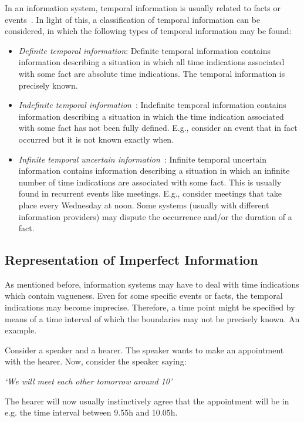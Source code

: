 In an information system, temporal information is usually related to facts or events~\cite{Chountas2000}. In light of this, a classification of temporal information can be considered, in which the following types of temporal information may be found:


\begin{itemize}
\item \emph{Definite temporal information}:
Definite temporal information contains information describing a situation in which all time indications associated with some fact are absolute time indications. The temporal information is precisely known.

\item \emph{Indefinite temporal information}~\cite{Dey1996}:
Indefinite temporal information contains information describing a situation in which the time indication associated with some fact has not been fully defined. E.g., consider an event that in fact occurred but it is not known exactly when.

\item \emph{Infinite temporal uncertain information}~\cite{Kabanza1990}:
Infinite temporal uncertain information contains information describing a situation in which an infinite number of time indications are associated with some fact. This is usually found in recurrent events like meetings. E.g., consider meetings that take place every Wednesday at noon. Some systems (usually with different information providers) may dispute the occurrence and/or the duration of a fact.
\end{itemize}

\subsection{\label{subsec:representation}Representation of Imperfect Information}
As mentioned before, information systems may have to deal with time indications which contain vagueness. Even for some specific events or facts, the temporal indications may become imprecise. Therefore, a time point might be specified by means of a time interval of which the boundaries may not be precisely known. An example.

\begin{example}
Consider a speaker and a hearer. The speaker wants to make an appointment with the hearer. Now, consider the speaker saying: \\
\begin{center}
\emph{`We will meet each other tomorrow around 10'}\\
\end{center}
The hearer will now usually instinctively agree that the appointment will be in e.g. the time interval between 9.55h and 10.05h.
\end{example}

